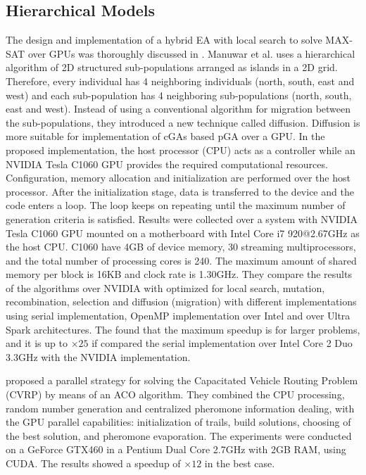 \documentclass[Afour,sageh,times]{sagej}
\begin{document}
\subsection{Hierarchical Models}


The design and implementation of a hybrid EA with local search to solve MAX-SAT over GPUs was thoroughly discussed in \citep{Munawar:2009:HGA:1666141_1666143}. Manuwar et al. uses a hierarchical algorithm of 2D structured sub-populations arranged as islands in a 2D grid. Therefore, every individual has 4 neighboring individuals (north, south, east and west) and each sub-population has 4 neighboring sub-populations (north, south, east and west). Instead of using a conventional algorithm for migration between the sub-populations, they introduced a new technique called diffusion. Diffusion is more suitable for implementation of cGAs based pGA over a GPU. In the proposed implementation, the host processor (CPU) acts as a controller while an NVIDIA Tesla C1060 GPU provides the required computational resources. Configuration, memory allocation and initialization are performed over the host processor. After the initialization stage, data is transferred to the device and the code enters a loop. The loop keeps on repeating until the maximum number of generation criteria is satisfied. Results were collected over a system with NVIDIA Tesla C1060 GPU mounted on a motherboard with Intel Core i7 920@2.67GHz as the host CPU. C1060 have 4GB of device memory, 30 streaming multiprocessors, and the total number of processing cores is 240. The maximum amount of shared memory per block is 16KB and clock rate is 1.30GHz. They compare the results of the algorithms over NVIDIA with optimized for local search, mutation, recombination, selection and diffusion (migration) with different implementations using serial implementation, OpenMP implementation over Intel and over Ultra Spark architectures. The found that the maximum speedup is for larger problems, and it is up to $\times25$ if compared the serial implementation over Intel Core 2 Duo 3.3GHz with the NVIDIA implementation. 

\cite{fjdiego-vrp}proposed a parallel strategy for solving the Capacitated Vehicle Routing Problem (CVRP) by means of an ACO algorithm. They combined the CPU processing, random number generation and centralized pheromone information dealing, with the GPU parallel capabilities: initialization of trails, build solutions, choosing of the best solution, and pheromone evaporation. The experiments were conducted on a GeForce GTX460 in a Pentium Dual Core 2.7GHz with 2GB RAM, using CUDA. The results showed a speedup of $\times12$ in the best case.
\end{document}
